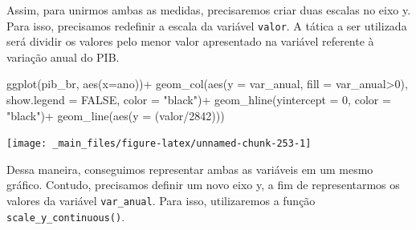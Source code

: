 \documentclass[
  brazilian,
]{book}
\newenvironment{Shaded}{\begin{snugshade}}{\end{snugshade}}
\newcommand{\AttributeTok}[1]{\textcolor[rgb]{0.77,0.63,0.00}{#1}}
\newcommand{\ConstantTok}[1]{\textcolor[rgb]{0.00,0.00,0.00}{#1}}
\newcommand{\DecValTok}[1]{\textcolor[rgb]{0.00,0.00,0.81}{#1}}
\newcommand{\FunctionTok}[1]{\textcolor[rgb]{0.00,0.00,0.00}{#1}}
\newcommand{\NormalTok}[1]{#1}
\newcommand{\SpecialCharTok}[1]{\textcolor[rgb]{0.00,0.00,0.00}{#1}}
\newcommand{\StringTok}[1]{\textcolor[rgb]{0.31,0.60,0.02}{#1}}
\begin{document}
Assim, para unirmos ambas as medidas, precisaremos criar duas escalas no eixo y. Para isso, precisamos redefinir a escala da variável \texttt{valor}. A tática a ser utilizada será dividir os valores pelo menor valor apresentado na variável referente à variação anual do PIB.

\begin{Shaded}
\begin{Highlighting}[]
\FunctionTok{ggplot}\NormalTok{(pib\_br,}
       \FunctionTok{aes}\NormalTok{(}\AttributeTok{x=}\NormalTok{ano))}\SpecialCharTok{+}
  \FunctionTok{geom\_col}\NormalTok{(}\FunctionTok{aes}\NormalTok{(}\AttributeTok{y =}\NormalTok{ var\_anual,}
               \AttributeTok{fill =}\NormalTok{ var\_anual}\SpecialCharTok{\textgreater{}}\DecValTok{0}\NormalTok{),}
           \AttributeTok{show.legend =} \ConstantTok{FALSE}\NormalTok{,}
           \AttributeTok{color =} \StringTok{"black"}\NormalTok{)}\SpecialCharTok{+}
  \FunctionTok{geom\_hline}\NormalTok{(}\AttributeTok{yintercept =} \DecValTok{0}\NormalTok{, }\AttributeTok{color =} \StringTok{"black"}\NormalTok{)}\SpecialCharTok{+}
  \FunctionTok{geom\_line}\NormalTok{(}\FunctionTok{aes}\NormalTok{(}\AttributeTok{y =}\NormalTok{ (valor}\SpecialCharTok{/}\DecValTok{2842}\NormalTok{)))}
\end{Highlighting}
\end{Shaded}

\begin{center}\texttt{[image: \_main\_files/figure-latex/unnamed-chunk-253-1]} \end{center}

Dessa maneira, conseguimos representar ambas as variáveis em um mesmo gráfico. Contudo, precisamos definir um novo eixo y, a fim de representarmos os valores da variável \texttt{var\_anual}. Para isso, utilizaremos a função \texttt{scale\_y\_continuous()}.
\end{document}
